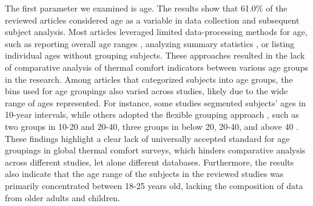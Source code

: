 \documentclass[final,3p,times,12pt]{elsarticle}
\begin{document}
The first parameter we examined is age. The results show that 61.0\% of the reviewed articles considered age as a variable in data collection and subsequent subject analysis. 
Most articles leveraged limited data-processing methods for age, such as reporting overall age ranges \cite{zhouThermalComfortRadiant2019,zhouRadiantAsymmetricThermal2022}, analyzing summary statistics \cite{caoIndividualDistrictHeating2014,caoTooColdToo2016,wangThermalAdaptationThermal2014,wangIndividualDifferenceThermal2018,yanAnalysisBehaviourPatterns2016,yanInfluenceOutdoorTemperature2016}, or listing individual ages \cite{xuEnvironmentalFactorsAffecting2021} without grouping subjects.
These approaches resulted in the lack of comparative analysis of thermal comfort indicators between various age groups in the research. 
Among articles that categorized subjects into age groups, the bins used for age groupings also varied across studies, likely due to the wide range of ages represented.
For instance, some studies \cite{boudenAdaptiveThermalComfort2005,jiaThermalComfortMixedmode2020,konisEvaluatingDaylightingEffectiveness2013} segmented subjects' ages in 10-year intervals, while others adopted the flexible grouping approach \cite{wangRevisitingIndividualGroup2020b,singhRelationIndoorThermal2014}, such as two groups in 10-20 and 20-40, three groups in below 20, 20-40, and above 40 \cite{singhThermalPerformanceStudy2010}. 
These findings highlight a clear lack of universally accepted standard for age groupings in global thermal comfort surveys, which hinders comparative analysis across different studies, let alone different databases.
Furthermore, the results also indicate that the age range of the subjects in the reviewed studies was primarily concentrated between 18-25 years old, lacking the composition of data from older adults and children.
\end{document}
